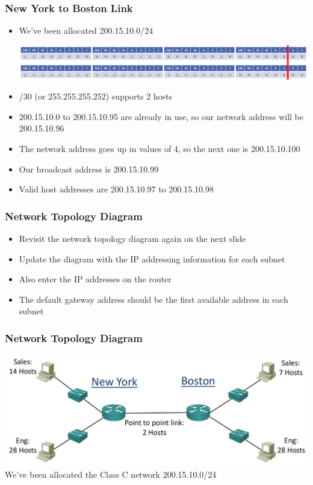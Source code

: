 \documentclass[pdflatex,compress]{beamer}
\begin{document}
\begin{frame}
	\frametitle{New York to Boston Link}
	\begin{itemize}
		\item We’ve been allocated 200.15.10.0/24
		\begin{center}
			\includegraphics[width=\linewidth]{img/img13}
		\end{center}
		\item /30 (or 255.255.255.252) supports 2 hosts
		\item 200.15.10.0 to 200.15.10.95 are already in use, so our network address will be 200.15.10.96
		\item The network address goes up in values of 4, so the next one is 200.15.10.100
		\item Our broadcast address is 200.15.10.99
		\item Valid host addresses are 200.15.10.97 to 200.15.10.98
	\end{itemize}
\end{frame}

\begin{frame}
	\frametitle{Network Topology Diagram}
	\begin{itemize}
		\item Revisit the network topology diagram again on the next slide
		\item Update the diagram with the IP addressing information for each subnet
		\item Also enter the IP addresses on the router
		\item The default gateway address should be the first available address in each subnet
	\end{itemize}
\end{frame}

\begin{frame}
	\frametitle{Network Topology Diagram}
	\begin{center}
		\includegraphics[width=\linewidth]{img/img14}
		We've been allocated the Class C network 200.15.10.0/24
	\end{center}
\end{frame}
\end{document}
